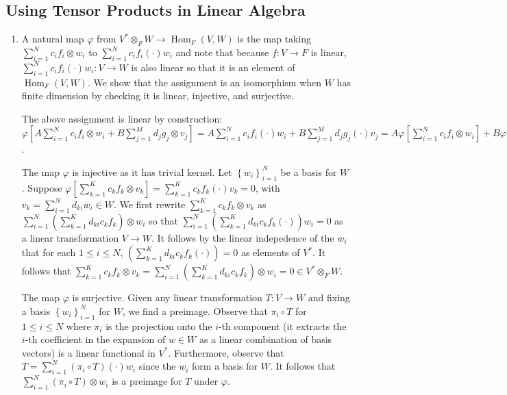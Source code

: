 \documentclass[11pt]{article}
\newcommand{\cbr}[1]{\left\{#1\right\}}
\DeclareMathOperator{\Hom}{Hom}
\begin{document}
\subsection*{Using Tensor Products in Linear Algebra} \begin{enumerate}[label=(\alph*)]
    \item A natural map $\varphi$ from $V^\ast\otimes_F W\to \Hom_F(V,W)$ is the map taking $\sum_{i = 1}^N c_i f_i\otimes w_i$ to $\sum_{i=1}^N c_if_i(\cdot)w_i$ and note that because $f\colon V\to F$ is linear, $\sum_{i=1}^N c_if_i(\cdot)w_i\colon V\to W$ is also linear so that it is an element of $\Hom_F(V,W)$. We show that the assignment is an isomorphism when $W$ has finite dimension by checking it is linear, injective, and surjective.
    
    The above assignment is linear by construction: $\varphi[A\sum_{i = 1}^N c_i f_i\otimes w_i + B\sum_{j = 1}^M d_j g_j\otimes v_j] = A\sum_{i = 1}^N c_i f_i(\cdot) w_i + B\sum_{j = 1}^M d_j g_j(\cdot) v_j = A\varphi[\sum_{i = 1}^N c_i f_i\otimes w_i] + B\varphi[\sum_{j = 1}^M d_j g_j\otimes v_j]$.
    
    The map $\varphi$ is injective as it has trivial kernel. Let $\cbr{w_i}_{i=1}^N$ be a basis for $W$. Suppose $\varphi[\sum_{k = 1}^K c_k f_k\otimes v_k] = \sum_{k = 1}^K c_k f_k(\cdot) v_k= 0$, with $v_k = \sum_{i= 1}^N d_{ki}w_i\in W$. We first rewrite $\sum_{k = 1}^K c_k f_k\otimes v_k$ as $\sum_{i = 1}^N (\sum_{k=1}^K d_{ki}c_kf_k)\otimes w_i$ so that $\sum_{i = 1}^N (\sum_{k=1}^K d_{ki}c_kf_k(\cdot)) w_i = 0$ as a linear transformation $V\to W$. It follows by the linear indepedence of the $w_i$ that for each $1\leq i\leq N$, $(\sum_{k=1}^K d_{ki}c_kf_k(\cdot)) = 0$ as elements of $V^\ast$. It follows that $\sum_{k = 1}^K c_k f_k\otimes v_k=\sum_{i = 1}^N (\sum_{k=1}^K d_{ki}c_kf_k)\otimes w_i = 0\in V^\ast\otimes_F W$. 

    The map $\varphi$ is surjective. Given any linear transformation $T\colon V\to W$ and fixing a basis $\cbr{w_i}_{i=1}^N$ for $W$, we find a preimage. Observe that $\pi_i\circ T$ for $1\leq i\leq N$ where $\pi_i$ is the projection onto the $i$-th component (it extracts the $i$-th coefficient in the expansion of $w\in W$ as a linear combination of basis vectors) is a linear functional in $V^\ast$. Furthermore, observe that $T = \sum_{i = 1}^N (\pi_i\circ T)(\cdot) w_i$ since the $w_i$ form a basis for $W$. It follows that $\sum_{i = 1}^N (\pi_i\circ T)\otimes w_i$ is a preimage for $T$ under $\varphi$.


\end{enumerate}
\end{document}
